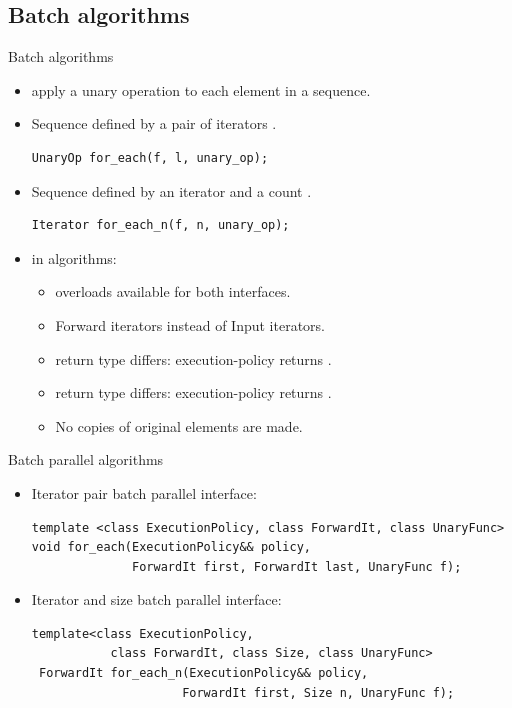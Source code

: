 \subsection{Batch algorithms}

\begin{frame}[t,fragile]{Batch algorithms}
\begin{itemize}
  \item {} apply a unary operation to each element in a sequence.
  
    \item Sequence defined by a pair of iterators \cppcode{[f, l)}.
\begin{lstlisting}
UnaryOp for_each(f, l, unary_op);
\end{lstlisting}
    \item Sequence defined by an iterator  and a count .
\begin{lstlisting}
Iterator for_each_n(f, n, unary_op);
\end{lstlisting}

     \item {} in  algorithms:
    \begin{itemize}
      \item {} overloads available for both interfaces.
      \item Forward iterators instead of Input iterators.
      \item {} return type differs: execution-policy returns .
      \item {} return type differs: execution-policy returns .
      \item No copies of original elements are made.
    \end{itemize}
\end{itemize}
\end{frame}

\begin{frame}[t,fragile]{Batch parallel algorithms}
  \begin{itemize}
    \item Iterator pair batch parallel interface:
\begin{lstlisting}
template <class ExecutionPolicy, class ForwardIt, class UnaryFunc>
void for_each(ExecutionPolicy&& policy,
              ForwardIt first, ForwardIt last, UnaryFunc f);
\end{lstlisting}

    \item Iterator and size batch parallel interface:
\begin{lstlisting}
template<class ExecutionPolicy,
           class ForwardIt, class Size, class UnaryFunc>
 ForwardIt for_each_n(ExecutionPolicy&& policy,
                     ForwardIt first, Size n, UnaryFunc f);
\end{lstlisting}
\end{itemize}
\end{frame}


